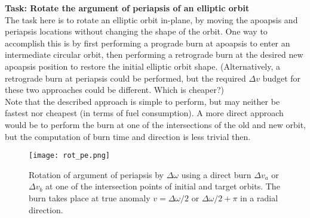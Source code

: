 \documentclass[Orbiter User Manual.tex]{subfiles}
\begin{document}
\noindent
\textbf{Task: Rotate the argument of periapsis of an elliptic orbit}\\
The task here is to rotate an elliptic orbit in-plane, by moving the apoapsis and periapsis locations without changing the shape of the orbit. One way to accomplish this is by first performing a prograde burn at apoapsis to enter an intermediate circular orbit, then performing a retrograde burn at the desired new apoapsis position to restore the initial elliptic orbit shape. (Alternatively, a retrograde burn at periapsis could be performed, but the required $\Delta v$ budget for these two approaches could be different. Which is cheaper?)\\
Note that the described approach is simple to perform, but may neither be fastest nor cheapest (in terms of fuel consumption). A more direct approach would be to perform the burn at one of the intersections of the old and new orbit, but the computation of burn time and direction is less trivial then.

\begin{figure}[H]
	\centering
	\texttt{[image: rot\_pe.png]}
	\caption{Rotation of argument of periapsis by $\Delta\omega$ using a direct burn $\Delta v_{a}$ or $\Delta v_{b}$ at one of the intersection points of initial and target orbits. The burn takes place at true anomaly $v = \Delta\omega / 2$ or $\Delta\omega / 2 + \pi$ in a radial direction.}
\end{figure}
\end{document}
